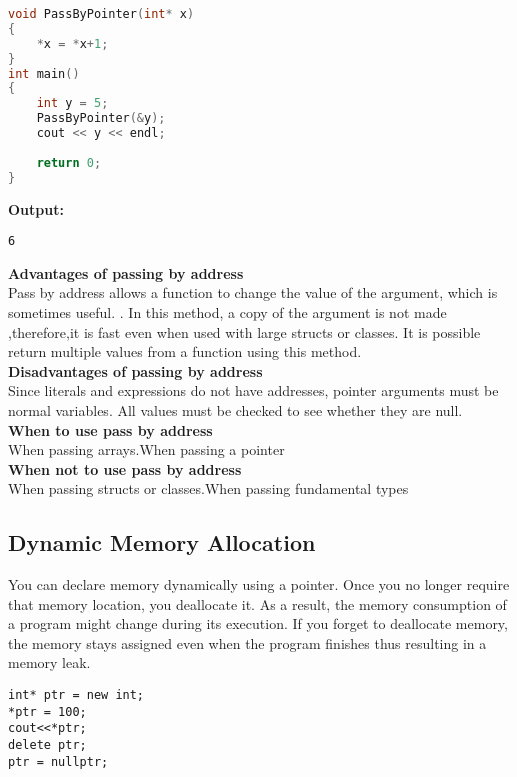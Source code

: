 \documentclass[11pt,fleqn]{book} %
\begin{document}
\begin{lstlisting}[language=C++, caption = Pass by Address]
void PassByPointer(int* x)
{
	*x = *x+1; 
}
int main()
{
	int y = 5;
	PassByPointer(&y); 
	cout << y << endl;
	
	return 0;
}
\end{lstlisting} 
\textbf{Output:} 
\begin{lstlisting}
6
\end{lstlisting}
\textbf{Advantages of passing by address}\\
Pass by address allows a function to change the value of the argument, which is sometimes useful. .
In this method, a copy of the argument is not made ,therefore,it is fast even when used with large structs or classes.
It is possible return multiple values from a function using this method.\\
\textbf{Disadvantages of passing by address}\\
Since literals and expressions do not have addresses, pointer arguments must be normal variables.
All values must be checked to see whether they are null.\\
\textbf{When to use pass by address}\\
When passing arrays.When passing a pointer\\
\textbf{When not to use pass by address}\\
When passing structs or classes.When passing fundamental types

\subsection{Dynamic Memory Allocation}
You can declare memory dynamically using a pointer. Once you no longer require that memory location, you deallocate it. As a result, the memory consumption of a program might change during its execution. If you forget to deallocate memory, the memory stays assigned even when the program finishes thus resulting in a memory leak.
\begin{lstlisting}
int* ptr = new int;
*ptr = 100;
cout<<*ptr;
delete ptr;
ptr = nullptr;
\end{lstlisting}
\end{document}
